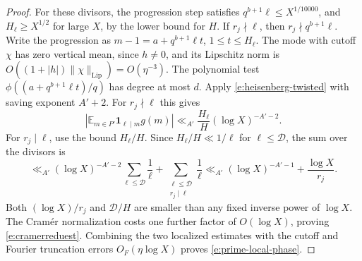 \documentclass[12pt]{amsart}
\newcommand{\1}{\mathbf 1}
\theoremstyle{definition}
\begin{document}
\begin{proof}
For these divisors, the progression step satisfies
\(q^{b+1}\ell\leq X^{1/10000}\), and \(H_\ell\geq X^{1/2}\)
for large \(X\), by the lower bound for \(H\). If \(r_j\nmid\ell\),
then \(r_j\nmid q^{b+1}\ell\). Write the progression as
\(m-1=a+q^{b+1}\ell t\), \(1\leq t\leq H_\ell\).
The mode with cutoff \(\chi\) has zero vertical mean, since
\(h\ne0\), and its Lipschitz norm is
\(O((1+|h|)\|\chi\|_{\mathrm{Lip}})=O(\eta^{-3})\).
The polynomial test
\(\phi((a+q^{b+1}\ell t)/q)\) has degree at most \(d\).
Apply \eqref{e:heisenberg-twisted} with saving exponent $A'+2$.
For $r_j\nmid\ell$ this gives
\[
 \left|\mathbb E_{m\in P'}\mathbf1_{\ell\mid m}g(m)\right|
 \ll_{A'}\frac{H_\ell}{H}(\log X)^{-A'-2}.
\]
For $r_j\mid\ell$, use the bound $H_\ell/H$. Since
$H_\ell/H\ll1/\ell$ for $\ell\leq\mathcal D$, the sum over
the divisors is
\[
 \ll_{A'}(\log X)^{-A'-2}\sum_{\ell\leq\mathcal D}\frac1\ell
 +\sum_{\substack{\ell\leq\mathcal D\\r_j\mid\ell}}\frac1\ell
 \ll_{A'}(\log X)^{-A'-1}+\frac{\log X}{r_j}.
\]
Both $(\log X)/r_j$ and $\mathcal D/H$ are smaller than any
fixed inverse power of $\log X$. The Cram\'er normalization
costs one further factor of $O(\log X)$, proving
\eqref{e:cramerreduest}. Combining the two localized estimates
with the cutoff and Fourier truncation errors
$O_F(\eta\log X)$ proves \eqref{e:prime-local-phase}.
\end{proof}


\end{document}
